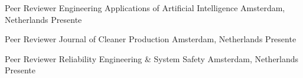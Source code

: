 \begin{cvhonors}

  \cvhonor
    {Peer Reviewer} %
    {Engineering Applications of Artificial Intelligence} %
    {Amsterdam, Netherlands} %
    {Presente} %

  \cvhonor
    {Peer Reviewer} %
    {Journal of Cleaner Production} %
    {Amsterdam, Netherlands} %
    {Presente} %

  \cvhonor
    {Peer Reviewer} %
    {Reliability Engineering \& System Safety} %
    {Amsterdam, Netherlands} %
    {Presente} %

\end{cvhonors}